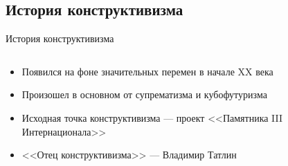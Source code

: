 \subsection{История конструктивизма}
\begin{frame}{История конструктивизма}






    \begin{columns}[T,onlytextwidth]
        \begin{column}{0.56\textwidth}
            \begin{itemize}
                \item<1-> Появился на фоне значительных перемен в начале XX века
                \item<2-> Произошел в основном от супрематизма и кубофутуризма
                \item<3-> Исходная точка конструктивизма --- проект <<Памятника III Интернационала>>
                \item<4-> <<Отец конструктивизма>> --- Владимир Татлин
            \end{itemize}
        \end{column}
        \begin{column}{0.4\textwidth}
            \begin{figure}
                \centering
            \end{figure}
        \end{column}
    \end{columns}
\end{frame}